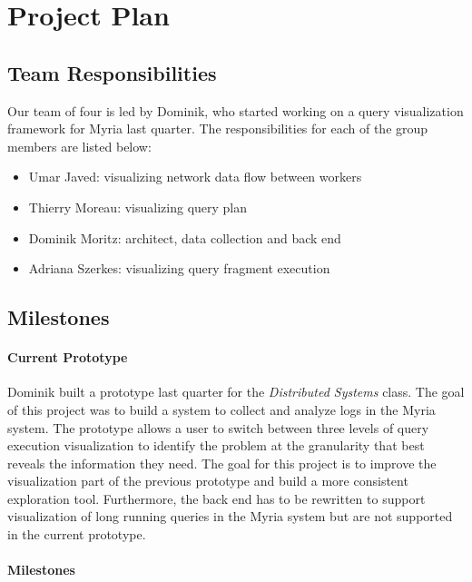 \section{Project Plan}

\subsection{Team Responsibilities}

Our team of four is led by Dominik, who started working on a query visualization framework for Myria last quarter. The responsibilities for each of the group members are listed below:

\begin {itemize}
    \item Umar Javed: visualizing network data flow between workers
    \item Thierry Moreau: visualizing query plan
    \item Dominik Moritz: architect, data collection and back end
    \item Adriana Szerkes: visualizing query fragment execution
\end{itemize}

\subsection{Milestones}

\paragraph{Current Prototype}

Dominik built a prototype last quarter for the \emph{Distributed Systems} class. The goal of this project was to build a system to collect and analyze logs in the Myria system. The prototype allows a user to switch between three levels of query execution visualization to identify the problem at the granularity that best reveals the information they need. The goal for this project is to improve the visualization part of the previous prototype and build a more consistent exploration tool. Furthermore, the back end has to be rewritten to support visualization of long running queries in the Myria system but are not supported in the current prototype.

\paragraph{Milestones}

